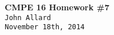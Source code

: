 \documentclass[a4paper,11pt]{article}
\begin{document}
   \begin{center}
      \Large\textbf{CMPE 16 Homework \#7}\\
      \large\texttt{John Allard} \\
      \small\texttt{November 18th, 2014}
   \end{center}

\end{document}
